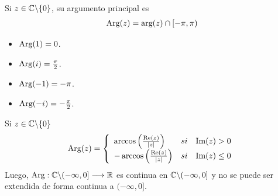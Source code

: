 \begin{defi}
    Si $z \in \mathbb{C} \backslash \{0\}$, su argumento principal es
    \begin{align*}
        \text{Arg}(z) = \text{arg}(z) \cap [-\pi,\pi)
    \end{align*}
\end{defi}

\begin{ejemplo}
    \begin{itemize}
        \item $\text{Arg}(1) = 0$.
        \item $\text{Arg}(i) = \frac{\pi}{2}$.
        \item $\text{Arg}(-1) = -\pi$.
        \item $\text{Arg}(-i) = -\frac{\pi}{2}$.
    \end{itemize}
\end{ejemplo}

\begin{obs}
    Si $z \in \mathbb{C} \backslash \{0\}$
    \begin{align*}
        \text{Arg}(z) = \left\{ \begin{array}{lcc}
                               \arccos\left( \frac{\text{Re}(z)}{|z|}\right)  & si & \text{Im}(z) > 0    \\
                               -\arccos\left( \frac{\text{Re}(z)}{|z|}\right) & si & \text{Im}(z) \leq 0 \\
                           \end{array}
        \right.
    \end{align*}
    Luego, $\text{Arg} : \mathbb{C} \backslash (-\infty,0] \longrightarrow \mathbb{R}$ es continua en $\mathbb{C} \backslash (-\infty,0]$ y no se puede ser extendida de forma continua a $(-\infty,0]$.
\end{obs}

